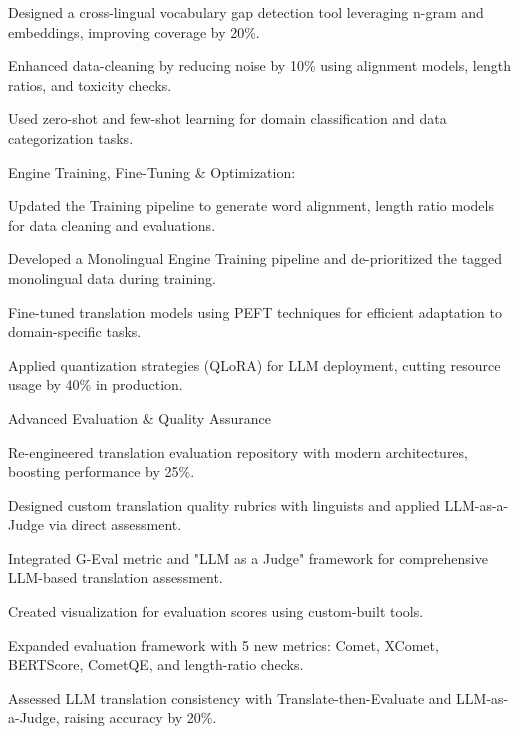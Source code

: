 \begin{cventries}
{\begin{cvitemswithheading}
        \item {Designed a cross-lingual vocabulary gap detection tool leveraging n-gram and embeddings, improving coverage by 20\%.}
        \item {Enhanced data-cleaning by reducing noise by 10\% using alignment models, length ratios, and toxicity checks.}
        \item {Used zero-shot and few-shot learning for domain classification and data categorization tasks.}
    \end{cvitemswithheading}
  }
  \cvexpproj
  {
    \begin{cvitemswithheading}
        {Engine Training, Fine-Tuning \& Optimization:}
        \item {Updated the Training pipeline to generate word alignment, length ratio models for data cleaning and evaluations.}
        \item {Developed a Monolingual Engine Training pipeline and de-prioritized the tagged monolingual data during training.}
        \item {Fine-tuned translation models using PEFT techniques for efficient adaptation to domain-specific tasks.}
        \item {Applied quantization strategies (QLoRA) for LLM deployment, cutting resource usage by 40\% in production.}
      \end{cvitemswithheading}
  }
  \cvexpproj
  {
    \begin{cvitemswithheading}
        {Advanced Evaluation \& Quality Assurance}
        \item {Re-engineered translation evaluation repository with modern architectures, boosting performance by 25\%.}
        \item {Designed custom translation quality rubrics with linguists and applied LLM-as-a-Judge via direct assessment.}
        \item {Integrated G-Eval metric and "LLM as a Judge" framework for comprehensive LLM-based translation assessment.}
        \item {Created visualization for evaluation scores using custom-built tools.}
        \item {Expanded evaluation framework with 5 new metrics: Comet, XComet, BERTScore, CometQE, and length-ratio checks.}
        \item {Assessed LLM translation consistency with Translate-then-Evaluate and LLM-as-a-Judge, raising accuracy by 20\%.}
    \end{cvitemswithheading}
  }

\end{cventries}
